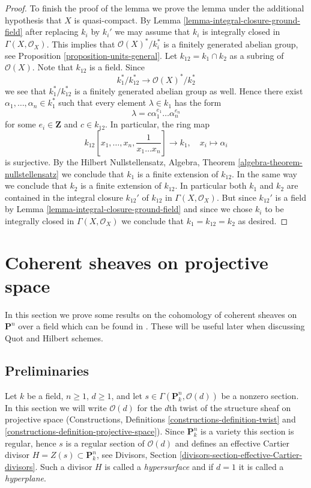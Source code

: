 \begin{proof}
\medskip\noindent
To finish the proof of the lemma we prove the lemma under the
additional hypothesis that $X$ is quasi-compact. By
Lemma \ref{lemma-integral-closure-ground-field}
after replacing $k_i$ by $k_i'$
we may assume that $k_i$ is integrally closed in $\Gamma(X, \mathcal{O}_X)$.
This implies that $\mathcal{O}(X)^*/k_i^*$ is a finitely generated
abelian group, see
Proposition \ref{proposition-units-general}.
Let $k_{12} = k_1 \cap k_2$ as a subring of $\mathcal{O}(X)$.
Note that $k_{12}$ is a field. Since
$$
k_1^*/k_{12}^* \longrightarrow \mathcal{O}(X)^*/k_2^*
$$
we see that $k_1^*/k_{12}^*$ is a finitely generated abelian group as well.
Hence there exist $\alpha_1, \ldots, \alpha_n \in k_1^*$ such that
every element $\lambda \in k_1$ has the form
$$
\lambda = c \alpha_1^{e_1} \ldots \alpha_n^{e_n}
$$
for some $e_i \in \mathbf{Z}$ and $c \in k_{12}$.
In particular, the ring map
$$
k_{12}[x_1, \ldots, x_n, \frac{1}{x_1 \ldots x_n}] \longrightarrow k_1, \quad
x_i \longmapsto \alpha_i
$$
is surjective. By the Hilbert Nullstellensatz,
Algebra, Theorem \ref{algebra-theorem-nullstellensatz}
we conclude that $k_1$ is a finite extension of $k_{12}$.
In the same way we conclude that $k_2$ is a finite extension of $k_{12}$.
In particular both $k_1$ and $k_2$ are contained in the integral closure
$k_{12}'$ of $k_{12}$ in $\Gamma(X, \mathcal{O}_X)$. But since $k_{12}'$
is a field by
Lemma \ref{lemma-integral-closure-ground-field}
and since we chose $k_i$ to be integrally closed in $\Gamma(X, \mathcal{O}_X)$
we conclude that $k_1 = k_{12} = k_2$ as desired.
\end{proof}






\section{Coherent sheaves on projective space}
\label{section-coherent-Pn}

\noindent
In this section we prove some results on the cohomology of coherent
sheaves on $\mathbf{P}^n$ over a field which can be found in
\cite{Mum}. These will be useful later
when discussing Quot and Hilbert schemes.

\subsection{Preliminaries}
\label{subsection-preliminaries}

\noindent
Let $k$ be a field, $n \geq 1$, $d \geq 1$, and let
$s \in \Gamma(\mathbf{P}_k^n, \mathcal{O}(d))$
be a nonzero section. In this section we will write $\mathcal{O}(d)$
for the $d$th twist of the structure sheaf on projective space
(Constructions, Definitions \ref{constructions-definition-twist} and
\ref{constructions-definition-projective-space}).
Since $\mathbf{P}^n_k$ is a variety this section is regular, hence
$s$ is a regular section of $\mathcal{O}(d)$ and defines an effective
Cartier divisor $H = Z(s) \subset \mathbf{P}^n_k$, see
Divisors, Section \ref{divisors-section-effective-Cartier-divisors}.
Such a divisor $H$ is called a {\it hypersurface} and if $d = 1$
it is called a {\it hyperplane}.

